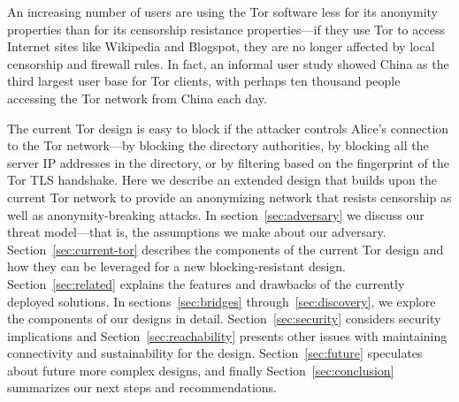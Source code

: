 \documentclass{llncs}
\begin{document}
An increasing number of users are using the Tor software
less for its anonymity properties than for its censorship
resistance properties---if they use Tor to access Internet sites like
Wikipedia
and Blogspot, they are no longer affected by local censorship
and firewall rules. In fact, an informal user study
showed China as the third largest user base
for Tor clients, with perhaps ten thousand people accessing the Tor
network from China each day.

The current Tor design is easy to block if the attacker controls Alice's
connection to the Tor network---by blocking the directory authorities,
by blocking all the server IP addresses in the directory, or by filtering
based on the fingerprint of the Tor TLS handshake. Here we describe an
extended design that builds upon the current Tor network to provide an
anonymizing
network that resists censorship as well as anonymity-breaking attacks.
In section~\ref{sec:adversary} we discuss our threat model---that is,
the assumptions we make about our adversary. Section~\ref{sec:current-tor}
describes the components of the current Tor design and how they can be
leveraged for a new blocking-resistant design. Section~\ref{sec:related}
explains the features and drawbacks of the currently deployed solutions.
In sections~\ref{sec:bridges} through~\ref{sec:discovery}, we explore the
components of our designs in detail.  Section~\ref{sec:security} considers
security implications and Section~\ref{sec:reachability} presents other
issues with maintaining connectivity and sustainability for the design.
Section~\ref{sec:future} speculates about future more complex designs,
and finally Section~\ref{sec:conclusion} summarizes our next steps and
recommendations.



\end{document}
